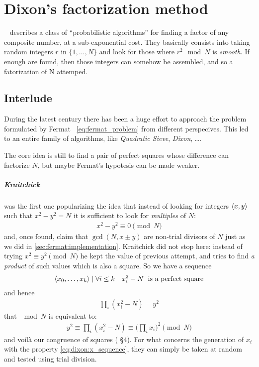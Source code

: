 \chapter{Dixon's factorization method\label{chap:dixon}}

~\cite{dixon} describes a class of ``probabilistic algorithms'' for finding a
factor of any composite number, at a sub-exponential cost. They basically
consists into taking random integers $r$ in $\{1, \ldots, N\}$ and look for those
where $r^2 \mod{N}$ is \emph{smooth}. If enough are found, then those integers
can somehow be assembled, and so a fatorization of N attemped.

\section{Interlude \label{sec:dixon:history}}
During the latest century there has been a huge effort to approach the problem
formulated by Fermat ~\ref{eq:fermat_problem} from different perspecives. This
led to an entire family of algorithms, like \emph{Quadratic Sieve},
\emph{Dixon}, \ldots.

The core idea is still to find a pair of perfect squares whose difference can
factorize $N$, but maybe Fermat's hypotesis can be made weaker.

\paragraph{Kraitchick} was the first one popularizing the idea that instead of
looking for integers $\langle x, y\rangle$ such that $x^2 -y^2 = N$ it is sufficient
to look for \emph{multiples} of $N$:
\begin{align}
  x^2 - y^2 \equiv 0 \pmod{N}
\end{align}
and, once found, claim that $\gcd(N, x \pm y)$ are non-trial divisors of $N$
just as we did in \ref{sec:fermat:implementation}.
Kraitchick did not stop here: instead of trying $x^2 \equiv y^2 \pmod{N}$ he
kept the value of previous attempt, and tries to find \emph{a product} of such
values which is also a square. So we have a sequence
\begin{align}
  \label{eq:dixon:x_sequence}
  \langle x_0, \ldots, x_k\rangle \mid \forall i \leq k \quad x_i^2 - N
  \; \text{ is a perfect square}
\end{align}
and hence
\begin{align*}
  \prod_i (x_i^2 - N) = y^2
\end{align*}
that $\mod{N}$ is equivalent to:
\begin{align}
  \label{eq:dixon:fermat_revisited}
  y^2 \equiv \prod_i (x_i^2 - N) \equiv \big( \prod_i x_i \big) ^2 \pmod{N}
\end{align}
and voil\`a our congruence of squares (\cite{discretelogs} \S 4). For what
concerns the generation of $x_i$ with the property \ref{eq:dixon:x_sequence},
they can simply be taken at random and tested using trial division.

